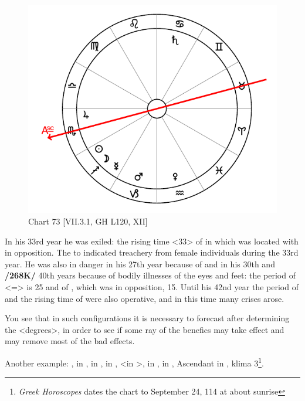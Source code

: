 \begin{figure}
\centering
\vspace{-20pt}
\includegraphics[width=.68\textwidth]{charts/7_3_1}
\caption{Chart 73 [VII.3.1, GH L120, XII]}
\label{fig:chart73}
\end{figure}

In his 33rd year he was exiled: the rising time <33> of \Cancer\xspace in which \Saturn\xspace was located with \Mars\xspace in opposition. The \Moon\xspace \Sextile\xspace to
\Venus\xspace indicated treachery from female individuals during the 33rd year. He was also in danger in his 27th year because of \Capricorn\xspace and in his 30th and \textbf{/268K/} 40th years because of bodily illnesses of the eyes and feet: the period of \Cancer <=\Moon> is 25 and of \Mars, which was in opposition, 15. Until his 42nd year the period of \Mars\xspace and the rising time of \Capricorn\xspace <27> were also operative, and in this time many crises arose. 

You see that in such configurations it is necessary to forecast after determining the <degrees>, in order to see if some ray of the benefics may take effect and may remove most of the bad effects.

\newpage
Another example: \Sun, \Venus\xspace in \Libra, \Saturn\xspace in \Aries, \Jupiter\xspace in \Taurus, \Mars\xspace <in \Libra>, \Mercury\xspace in \Virgo, \Moon\xspace in \Sagittarius, Ascendant in \Libra, klima 3\footnote{\textit{Greek Horoscopes} dates the chart to September 24, 114 at about sunrise}. 


